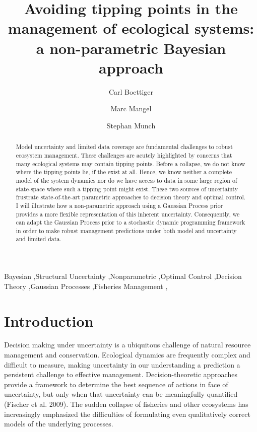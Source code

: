 \documentclass[author-year, review]{elsarticle} %
\begin{document}
\begin{frontmatter}

  \title{Avoiding tipping points in the management of ecological systems: a
non-parametric Bayesian approach}
    \author[cstar]{Carl Boettiger}
    \author[cstar]{Marc Mangel}
  
  
    \author[noaa]{Stephan Munch}
  
  
      \address[cstar]{Center for Stock Assessment Research, Department of Applied Math and
Statistics, University of California, Mail Stop SOE-2, Santa Cruz, CA
95064, USA}    
    \address[noaa]{Southwest Fisheries Science Center, National Oceanic and Atmospheric
Administration, 110 Shaffer Road, Santa Cruz, CA 95060, USA}    
  
  \begin{abstract}
  Model uncertainty and limited data coverage are fundamental challenges
  to robust ecosystem management. These challenges are acutely highlighted
  by concerns that many ecological systems may contain tipping points.
  Before a collapse, we do not know where the tipping points lie, if the
  exist at all. Hence, we know neither a complete model of the system
  dynamics nor do we have access to data in some large region of
  state-space where such a tipping point might exist. These two sources of
  uncertainty frustrate state-of-the-art parametric approaches to decision
  theory and optimal control. I will illustrate how a non-parametric
  approach using a Gaussian Process prior provides a more flexible
  representation of this inherent uncertainty. Consequently, we can adapt
  the Gaussian Process prior to a stochastic dynamic programming framework
  in order to make robust management predictions under both model and
  uncertainty and limited data.
  \end{abstract}
   \begin{keyword} Bayesian \sep Structural Uncertainty \sep Nonparametric \sep Optimal Control \sep Decision Theory \sep Gaussian Processes \sep Fisheries Management \sep \end{keyword}
 \end{frontmatter}


\section{Introduction}\label{introduction}

Decision making under uncertainty is a ubiquitous challenge of natural
resource management and conservation. Ecological dynamics are frequently
complex and difficult to measure, making uncertainty in our
understanding a prediction a persistent challenge to effective
management. Decision-theoretic approaches provide a framework to
determine the best sequence of actions in face of uncertainty, but only
when that uncertainty can be meaningfully quantified (Fischer et al.
2009). The sudden collapse of fisheries and other ecosystems has
increasingly emphasized the difficulties of formulating even
qualitatively correct models of the underlying processes.
\end{document}
